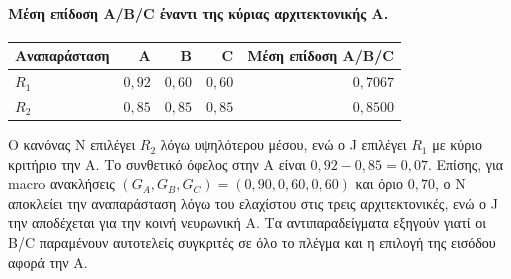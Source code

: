 \documentclass[11pt,a4paper]{article}
\begin{document}
\paragraph{Μέση επίδοση A/B/C έναντι της κύριας αρχιτεκτονικής A.}
\begin{center}\small
\begin{tabular}{@{}lrrrr@{}}
\toprule
Αναπαράσταση & A & B & C & Μέση επίδοση A/B/C\\
\midrule
$R_1$ & $0{,}92$ & $0{,}60$ & $0{,}60$ & $0{,}7067$\\
$R_2$ & $0{,}85$ & $0{,}85$ & $0{,}85$ & $0{,}8500$\\
\bottomrule
\end{tabular}
\end{center}
Ο κανόνας N επιλέγει $R_2$ λόγω υψηλότερου μέσου, ενώ ο J επιλέγει $R_1$ με κύριο κριτήριο την A. Το συνθετικό όφελος στην A είναι $0{,}92-0{,}85=0{,}07$. Επίσης, για macro ανακλήσεις $(G_A,G_B,G_C)=(0{,}90,0{,}60,0{,}60)$ και όριο $0{,}70$, ο N αποκλείει την αναπαράσταση λόγω του ελαχίστου στις τρεις αρχιτεκτονικές, ενώ ο J την αποδέχεται για την κοινή νευρωνική A. Τα αντιπαραδείγματα εξηγούν γιατί οι B/C παραμένουν αυτοτελείς συγκριτές σε όλο το πλέγμα και η επιλογή της εισόδου αφορά την A.
\end{document}

